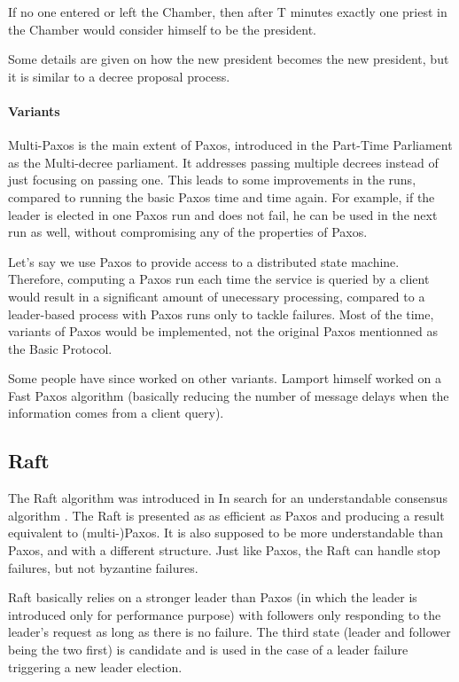 \documentclass[11pt, twocolumn]{article}
\begin{document}
\begin{displayquote}
    If no one entered or left the Chamber, then after T minutes exactly one priest in the Chamber would consider himself to be the president.
\end{displayquote}

Some details are given on how the new president becomes the new president, but it is similar to a decree proposal process.

\paragraph{Variants}

Multi-Paxos is the main extent of Paxos, introduced in the Part-Time Parliament as the Multi-decree parliament.
It addresses passing multiple decrees instead of just focusing on passing one. This leads to some improvements in the runs, compared to running the basic Paxos time and time again.
For example, if the leader is elected in one Paxos run and does not fail, he can be used in the next run as well, without compromising any of the properties of Paxos.

Let's say we use Paxos to provide access to a distributed state machine.
Therefore, computing a Paxos run each time the service is queried by a client would result in a significant amount of unecessary processing, compared to a leader-based process with Paxos runs only to tackle failures.
Most of the time, variants of Paxos would be implemented, not the original Paxos mentionned as the Basic Protocol.

Some people have since worked on other variants. Lamport himself worked on a Fast Paxos algorithm \cite{fastpaxos} (basically reducing the number of message delays when the information comes from a client query).


\subsection{Raft}

The Raft algorithm was introduced in In search for an understandable consensus algorithm \cite{understandable}.
The Raft is presented as as efficient as Paxos and producing a result equivalent to (multi-)Paxos.
It is also supposed to be more understandable than Paxos, and with a different structure. Just like Paxos, the Raft can handle stop failures, but not byzantine failures.

Raft basically relies on a stronger leader than Paxos (in which the leader is introduced only for performance purpose) with followers only responding to the leader's request as long as there is no failure.
The third state (leader and follower being the two first) is candidate and is used in the case of a leader failure triggering a new leader election.
\end{document}
